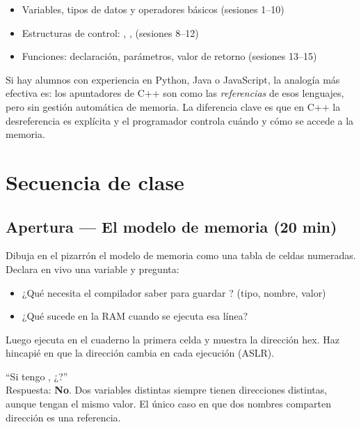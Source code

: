 \documentclass[12pt, oneside]{article}
\begin{document}
\begin{itemize}
  \item Variables, tipos de datos y operadores básicos (sesiones 1--10)
  \item Estructuras de control: , ,  (sesiones 8--12)
  \item Funciones: declaración, parámetros, valor de retorno (sesiones 13--15)
\end{itemize}

\begin{notaprofesor}
  Si hay alumnos con experiencia en Python, Java o JavaScript, la analogía
  más efectiva es: los apuntadores de C++ son como las \textit{referencias}
  de esos lenguajes, pero sin gestión automática de memoria. La diferencia
  clave es que en C++ la desreferencia es explícita y el programador
  controla cuándo y cómo se accede a la memoria.
\end{notaprofesor}

\section{Secuencia de clase}

\subsection{Apertura — El modelo de memoria (20 min)}

Dibuja en el pizarrón el modelo de memoria como una tabla de celdas numeradas.
Declara en vivo una variable  y pregunta:

\begin{itemize}
  \item ¿Qué necesita el compilador saber para guardar ? (tipo, nombre, valor)
  \item ¿Qué sucede en la RAM cuando se ejecuta esa línea?
\end{itemize}

Luego ejecuta en el cuaderno la primera celda y muestra la dirección hex.
Haz hincapié en que la dirección cambia en cada ejecución (ASLR).

\begin{notaprofesor}
  ``Si tengo , ¿?''\\
  Respuesta: \textbf{No}. Dos variables distintas siempre tienen direcciones
  distintas, aunque tengan el mismo valor. El único caso en que dos nombres
  comparten dirección es una referencia.
\end{notaprofesor}
\end{document}
